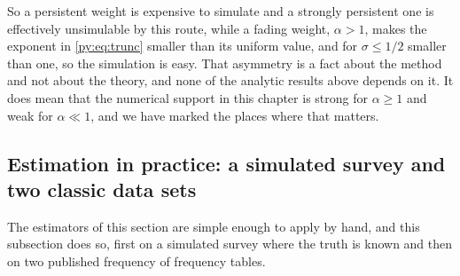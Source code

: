 So a persistent weight is expensive to simulate and a strongly persistent one is effectively
unsimulable by this route, while a fading weight, $\alpha > 1$, makes the exponent in
\eqref{py:eq:trunc} smaller than its uniform value, and for $\sigma \le 1/2$ smaller than one, so the simulation is easy. That asymmetry is a fact about the
method and not about the theory, and none of the analytic results above depends on it. It does
mean that the numerical support in this chapter is strong for $\alpha \ge 1$ and weak for
$\alpha \ll 1$, and we have marked the places where that matters.

\subsection{Estimation in practice: a simulated survey and two classic data sets}
\label{py:sec:worked}

The estimators of this section are simple enough to apply by hand, and this subsection does so,
first on a simulated survey where the truth is known and then on two published frequency of
frequency tables.


